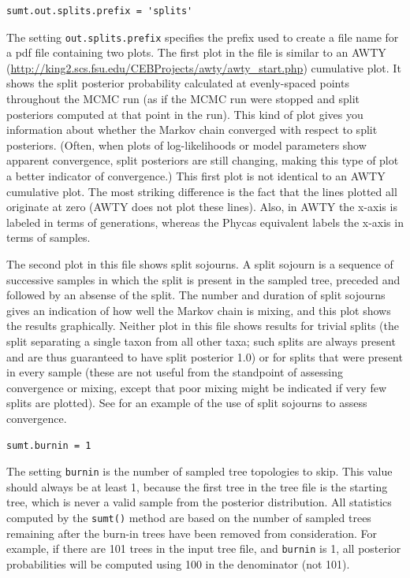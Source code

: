 \documentclass[10pt]{article}
\newcommand{\opt}[1]{{\tt \small #1}\index{#1}}	%
\begin{document}
\begin{samepage}
\begin{verbatim}
sumt.out.splits.prefix = 'splits'
\end{verbatim}
The setting \opt{out.splits.prefix} specifies the prefix used to create a file name for a pdf file containing two plots. The first plot in the file is similar to an AWTY (\url{http://king2.scs.fsu.edu/CEBProjects/awty/awty_start.php}) cumulative plot. It shows the split posterior probability calculated at evenly-spaced points throughout the MCMC run (as if the MCMC run were stopped and split posteriors computed at that point in the run). This kind of plot gives you information about whether the Markov chain converged with respect to split posteriors. (Often, when plots of log-likelihoods or model parameters show apparent convergence, split posteriors are still changing, making this type of plot a better indicator of convergence.) This first plot is not identical to an AWTY cumulative plot. The most striking difference is the fact that the lines plotted all originate at zero (AWTY does not plot these lines). Also, in AWTY the x-axis is labeled in terms of generations, whereas the Phycas equivalent labels the x-axis in terms of samples. 

The second plot in this file shows split sojourns. A split sojourn is a sequence of successive samples in which the split is present in the sampled tree, preceded and followed by an absense of the split. The number and duration of split sojourns gives an indication of how well the Markov chain is mixing, and this plot shows the results graphically. Neither plot in this file shows results for trivial splits (the split separating a single taxon from all other taxa; such splits are always present and are thus guaranteed to have split posterior 1.0) or for splits that were present in every sample (these are not useful from the standpoint of assessing convergence or mixing, except that poor mixing might be indicated if very few splits are plotted). See \citet{LewisLewis2005} for an example of the use of split sojourns to assess convergence. 
\end{samepage}

\begin{samepage}
\begin{verbatim}
sumt.burnin = 1
\end{verbatim}
The setting \opt{burnin} is the number of sampled tree topologies to skip. This value should always be at least 1, because the first tree in the tree file is the starting tree, which is never a valid sample from the posterior distribution. All statistics computed by the {\tt sumt()} method are based on the number of sampled trees remaining after the burn-in trees have been removed from consideration. For example, if there are 101 trees in the input tree file, and \opt{burnin} is 1, all posterior probabilities will be computed using 100 in the denominator (not 101).
\end{samepage}
\end{document}

